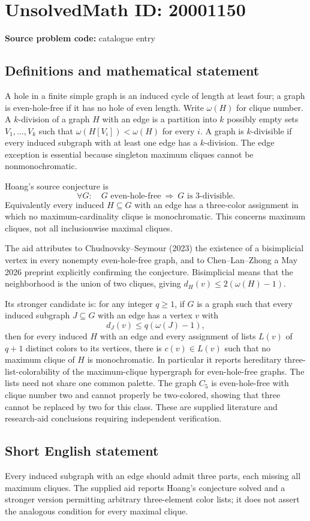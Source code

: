 \documentclass[11pt]{article}
\begin{document}
\section*{UnsolvedMath ID: 20001150}
\textbf{Source problem code:} catalogue entry
\subsection{Definitions and mathematical statement}
A hole in a finite simple graph is an induced cycle of length at least four; a graph is even-hole-free if it has no hole of even length. Write $\omega(H)$ for clique number. A $k$-division of a graph $H$ with an edge is a partition into $k$ possibly empty sets $V_1,\ldots,V_k$ such that $\omega(H[V_i])<\omega(H)$ for every $i$. A graph is $k$-divisible if every induced subgraph with at least one edge has a $k$-division. The edge exception is essential because singleton maximum cliques cannot be nonmonochromatic.

Hoang's source conjecture is
\[
 \forall G:\quad G\text{ even-hole-free}\ \Longrightarrow\ G\text{ is $3$-divisible}.
\]
Equivalently every induced $H\subseteq G$ with an edge has a three-color assignment in which no maximum-cardinality clique is monochromatic. This concerns maximum cliques, not all inclusionwise maximal cliques.

The aid attributes to Chudnovsky--Seymour (2023) the existence of a bisimplicial vertex in every nonempty even-hole-free graph, and to Chen--Lan--Zhong a May 2026 preprint explicitly confirming the conjecture. Bisimplicial means that the neighborhood is the union of two cliques, giving $d_H(v)\leq2(\omega(H)-1)$.

Its stronger candidate is: for any integer $q\geq1$, if $G$ is a graph such that every induced subgraph $J\subseteq G$ with an edge has a vertex $v$ with
\[
 d_J(v)\leq q(\omega(J)-1),
\]
then for every induced $H$ with an edge and every assignment of lists $L(v)$ of $q+1$ distinct colors to its vertices, there is $c(v)\in L(v)$ such that no maximum clique of $H$ is monochromatic. In particular it reports hereditary three-list-colorability of the maximum-clique hypergraph for even-hole-free graphs. The lists need not share one common palette. The graph $C_5$ is even-hole-free with clique number two and cannot properly be two-colored, showing that three cannot be replaced by two for this class. These are supplied literature and research-aid conclusions requiring independent verification.
\subsection{Short English statement}
Every induced subgraph with an edge should admit three parts, each missing all maximum cliques. The supplied aid reports Hoang's conjecture solved and a stronger version permitting arbitrary three-element color lists; it does not assert the analogous condition for every maximal clique.
\end{document}
